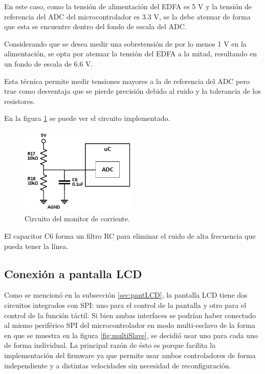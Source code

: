 En este caso, como la tensión de alimentación del EDFA es 5 V y la tensión de referencia del ADC del microcontrolador es 3.3 V, se la debe atenuar de forma que esta se encuentre dentro del fondo de escala del ADC.

Considerando que se desea medir una sobretensión de por lo menos 1 V en la alimentación, se opta por atenuar la tensión del EDFA a la mitad, resultando en un fondo de escala de 6.6 V.

Esta técnica permite medir tensiones mayores a la de referencia del ADC pero trae como desventaja que se pierde precisión debido al ruido y la tolerancia de los resistores.

En la figura \ref{fig:monTension} se puede ver el circuito implementado.

\begin{figure}[H]
\centering
\includegraphics[width=0.5\textwidth]{./Figures/mon_tension.png}
\caption{Circuito del monitor de corriente.}
\label{fig:monTension}
\end{figure}

El capacitor C6 forma un filtro RC para eliminar el ruido de alta frecuencia que pueda tener la línea.

\subsection{Conexión a pantalla LCD}
\label{sec:conLCD}

Como se mencionó en la subsección \ref{sec:pantLCD}, la pantalla LCD tiene dos circuitos integrados con SPI: uno para el control de la pantalla y otro para el control de la función táctil. Si bien ambas interfaces se podrían haber conectado al mismo periférico SPI del microcontrolador en modo multi-esclavo de la forma en que se muestra en la figura \ref{fig:multiSlave}, se decidió usar uno para cada uno de forma individual. La principal razón de ésto es porque facilita la implementación del firmware ya que permite usar ambos controladores de forma independiente y a distintas velocidades sin necesidad de reconfiguración.

